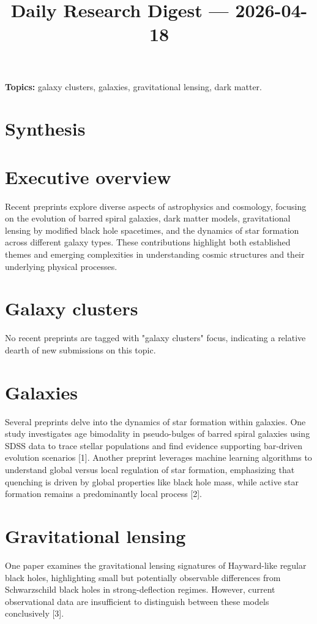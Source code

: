 \documentclass[11pt]{article}
\begin{document}
\title{Daily Research Digest --- 2026-04-18}
\author{}
\date{}
\maketitle
\textbf{Topics:} galaxy clusters, galaxies, gravitational lensing, dark matter.
\section*{Synthesis}
\section*{Executive overview}
Recent preprints explore diverse aspects of astrophysics and cosmology, focusing on the evolution of barred spiral galaxies, dark matter models, gravitational lensing by modified black hole spacetimes, and the dynamics of star formation across different galaxy types. These contributions highlight both established themes and emerging complexities in understanding cosmic structures and their underlying physical processes.
\section*{Galaxy clusters}
No recent preprints are tagged with "galaxy clusters" focus, indicating a relative dearth of new submissions on this topic.
\section*{Galaxies}
Several preprints delve into the dynamics of star formation within galaxies. One study investigates age bimodality in pseudo-bulges of barred spiral galaxies using SDSS data to trace stellar populations and find evidence supporting bar-driven evolution scenarios [1]. Another preprint leverages machine learning algorithms to understand global versus local regulation of star formation, emphasizing that quenching is driven by global properties like black hole mass, while active star formation remains a predominantly local process [2].
\section*{Gravitational lensing}
One paper examines the gravitational lensing signatures of Hayward-like regular black holes, highlighting small but potentially observable differences from Schwarzschild black holes in strong-deflection regimes. However, current observational data are insufficient to distinguish between these models conclusively [3].
\end{document}
